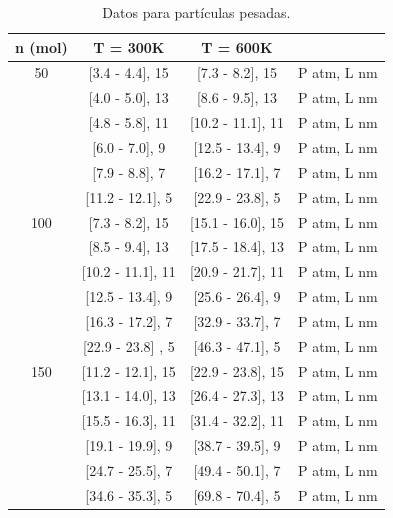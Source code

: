 \documentclass[a4paper, 12p]{article}
\begin{document}
\begin{table}[H]
 \centering
 \begin{tabular}{|c|c|c|l|} \hline
  n (mol)&  T = 300K        &    T = 600K    &        \\ \hline
   50    & [3.4 - 4.4], 15 & [7.3 - 8.2], 15& P atm, L nm\\ 
         & [4.0 - 5.0], 13 & [8.6 - 9.5], 13& P atm, L nm\\
         & [4.8 - 5.8], 11 & [10.2 - 11.1], 11& P atm, L nm\\ 
         & [6.0 - 7.0],  9 & [12.5 - 13.4],  9& P atm, L nm\\ 
         & [7.9 - 8.8],  7 & [16.2 - 17.1],  7& P atm, L nm\\  
         & [11.2 - 12.1], 5 & [22.9 - 23.8],  5& P atm, L nm\\ \hline
   100   & [7.3 - 8.2], 15 & [15.1 - 16.0], 15& P atm, L nm\\ 
         & [8.5 - 9.4], 13 & [17.5 - 18.4], 13& P atm, L nm\\
         & [10.2 - 11.1], 11 & [20.9 - 21.7], 11& P atm, L nm\\ 
         & [12.5 - 13.4], 9 & [25.6 - 26.4],  9& P atm, L nm\\ 
         & [16.3 - 17.2], 7 & [32.9 - 33.7],  7& P atm, L nm\\  
         & [22.9 - 23.8] , 5 & [46.3 - 47.1],  5& P atm, L nm\\ \hline
   150   & [11.2 - 12.1], 15 & [22.9 - 23.8], 15& P atm, L nm\\ 
         & [13.1 - 14.0], 13 & [26.4 - 27.3], 13& P atm, L nm\\
         & [15.5 - 16.3], 11 & [31.4 - 32.2], 11& P atm, L nm\\ 
         & [19.1 - 19.9],  9 & [38.7 - 39.5],  9& P atm, L nm\\ 
         & [24.7 - 25.5],  7 & [49.4 - 50.1],  7& P atm, L nm\\  
         & [34.6 - 35.3],  5 & [69.8 - 70.4],  5& P atm, L nm\\ \hline

   

\end{tabular}
\caption{\label{tab:Pesadas} Datos para partículas pesadas.}
\end{table}
\end{document}
